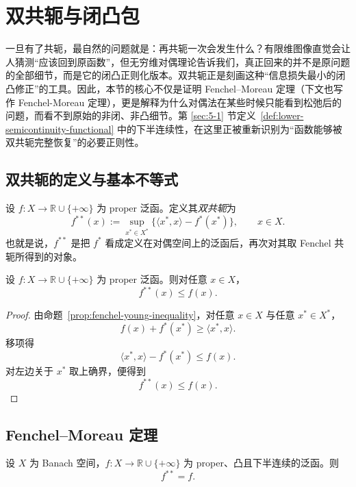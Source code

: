\section{双共轭与闭凸包}

\label{sec:6-2}

一旦有了共轭，最自然的问题就是：再共轭一次会发生什么？有限维图像直觉会让人猜测“应该回到原函数”，但无穷维对偶理论告诉我们，真正回来的并不是原问题的全部细节，而是它的闭凸正则化版本。双共轭正是刻画这种“信息损失最小的闭凸修正”的工具。因此，本节的核心不仅是证明 Fenchel--Moreau 定理（下文也写作 Fenchel-Moreau 定理），更是解释为什么对偶法在某些时候只能看到松弛后的问题，而看不到原始的非闭、非凸细节。第 \ref{sec:5-1} 节定义~\ref{def:lower-semicontinuity-functional} 中的下半连续性，在这里正被重新识别为“函数能够被双共轭完整恢复”的必要正则性。

\subsection{双共轭的定义与基本不等式}

\begin{definition}[双共轭]\label{def:biconjugate-functional}
设 $f\colon X\to \mathbb R\cup\{+\infty\}$ 为 proper 泛函。定义其\emph{双共轭}为
\[
f^{\ast\ast}(x):=\sup_{x^\ast\in X^\ast}\{\langle x^\ast,x\rangle-f^\ast(x^\ast)\},
\qquad x\in X.
\]
也就是说，$f^{\ast\ast}$ 是把 $f^\ast$ 看成定义在对偶空间上的泛函后，再次对其取 Fenchel 共轭所得到的对象。
\end{definition}

\begin{proposition}[双共轭总在原函数之下]\label{prop:biconjugate-below-function}
设 $f\colon X\to \mathbb R\cup\{+\infty\}$ 为 proper 泛函。则对任意 $x\in X$，
\[
f^{\ast\ast}(x)\le f(x).
\]
\end{proposition}

\begin{proof}
由命题~\ref{prop:fenchel-young-inequality}，对任意 $x\in X$ 与任意 $x^\ast\in X^\ast$，
\[
f(x)+f^\ast(x^\ast)\ge \langle x^\ast,x\rangle.
\]
移项得
\[
\langle x^\ast,x\rangle-f^\ast(x^\ast)\le f(x).
\]
对左边关于 $x^\ast$ 取上确界，便得到
\[
f^{\ast\ast}(x)\le f(x).
\]
\end{proof}

\subsection{Fenchel--Moreau 定理}

\begin{theorem}\label{thm:fenchel-moreau}
设 $X$ 为 Banach 空间，$f\colon X\to \mathbb R\cup\{+\infty\}$ 为 proper、凸且下半连续的泛函。则
\[
f^{\ast\ast}=f.
\]
\end{theorem}

